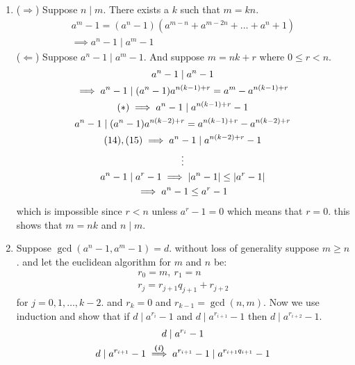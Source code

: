 \begin{enumerate}[label=\textbf{(\textit{\roman*})}]
    \item ($\Rightarrow$) Suppose $n\mid m$. There exists a $k$ such that $m = kn$.
            \begin{gather*}
                a^m - 1 = (a^n - 1)(a^{m - n} + a^{m - 2n} + \dots + a^n + 1) \\
                \implies a^n - 1 \mid a^m - 1
            \end{gather*}
        ($\Leftarrow$) Suppose $a^n - 1 \mid a^m - 1$. And suppose $m = nk + r$ where $0 \le r < n$.
        \begin{gather}
            a^n - 1 \mid a^n - 1 \\
            \implies a^n - 1 \mid (a^n - 1) a^{n(k - 1) + r} = a^m - a^{n(k - 1) + r}\\
            (*) \implies a^n -1 \mid a^{n(k - 1) + r} - 1 \\
            a^n - 1 \mid (a^n - 1) a^{n(k - 2)+ r} = a^{n(k - 1) + r} - a^{n(k - 2) + r} \\
            (14), (15)\implies a^n - 1 \mid a^{n(k - 2) + r} - 1 \\
            \vdots \notag \\
            a^n - 1 \mid a^r - 1 \implies |a^n - 1| \le |a^r - 1|\\
            \implies a^n - 1 \le a^r - 1
        \end{gather}
        which is impossible since $r < n$ unless $a^r - 1 = 0$ which means that $r = 0$.
        this shows that $m = nk$ and $n \mid m$.
    \item 
        Suppose $\gcd(a^n - 1, a^m - 1) = d$. without loss of generality suppose $m \ge n$.
        and let the euclidean algorithm for $m$ and $n$ be:
        \begin{gather*}
            r_0 = m, \ r_1 = n \\
            r_j = r_{j + 1} q_{j + 1} + r_{j + 2}
        \end{gather*}
        for $j = 0, 1, \dots , k - 2$. and $r_k = 0$ and $r_{k - 1} = \gcd(n, m)$. Now we use induction and show that if $d \mid a^{r_i} - 1$ and $d \mid a^{r_{i + 1}} - 1$ then $d \mid a^{r_{i + 2}} - 1$.
        \begin{gather}
            d \mid a^{r_i} - 1 \\
            d \mid a^{r_{i + 1}} - 1 \overset{\textbf{(\textit{i})}}{\implies} a^{r_{i + 1}} - 1 \mid a^{r_{i + 1}q_{i + 1}} - 1 \\

\end{gather}
\end{enumerate}
